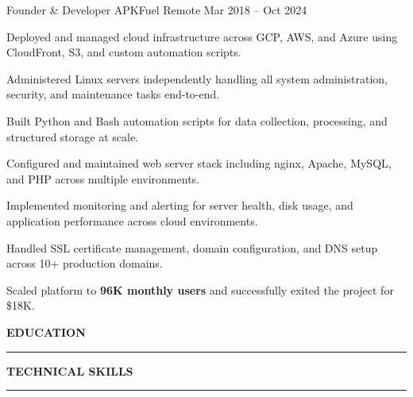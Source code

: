 \documentclass[11pt, a4paper]{awesome-cv}
\renewcommand{\acvSectionTopSkip}{2mm}
\renewcommand{\acvSectionContentTopSkip}{1.5mm}
\renewcommand{\cvsection}[1]{%
  \vspace{\acvSectionTopSkip}
  \phantomsection{}
  {\fontsize{16pt}{1em}\bodyfont\bfseries\color{sectioncolor}\MakeUppercase{#1}}\\[-2mm]
  {\color{sectioncolor}\hrule}
  \vspace{\acvSectionContentTopSkip}
}
\begin{document}
\begin{cventries}
  \cventry
    {Founder \& Developer}
    {APKFuel}
    {Remote}
    {Mar 2018 -- Oct 2024}
    {
      \begin{cvitems}
        \item {Deployed and managed cloud infrastructure across GCP, AWS, and Azure using CloudFront, S3, and custom automation scripts.}
        \item {Administered Linux servers independently handling all system administration, security, and maintenance tasks end-to-end.}
        \item {Built Python and Bash automation scripts for data collection, processing, and structured storage at scale.}
        \item {Configured and maintained web server stack including nginx, Apache, MySQL, and PHP across multiple environments.}
        \item {Implemented monitoring and alerting for server health, disk usage, and application performance across cloud environments.}
        \item {Handled SSL certificate management, domain configuration, and DNS setup across 10+ production domains.}
        \item {Scaled platform to \textbf{96K monthly users} and successfully exited the project for \$18K.}
      \end{cvitems}
    }

\end{cventries}

\cvsection{Education}

\begin{cvskills}
\end{cvskills}

\cvsection{Technical Skills}

\begin{cvskills}
\end{cvskills}
\end{document}
